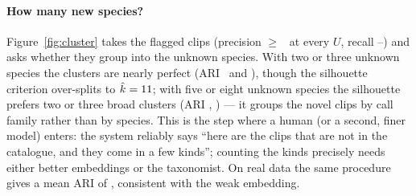 \paragraph{How many new species?} Figure~\ref{fig:cluster} takes the flagged
clips (precision $\geq$ \CluPrecMin\ at every $U$, recall \CluRecallUTwo--\CluRecallUFive)
and asks whether they group into the unknown species. With two or three
unknown species the clusters are nearly perfect (ARI \CluAriUTwo\ and
\CluAriUThree), though the silhouette criterion over-splits to
$\hat k = 11$; with five or eight unknown species the silhouette
prefers two or three broad clusters (ARI \CluAriUFive, \CluAriUEight) ---
it groups the novel clips by call family rather than by species. This is the
step where a human (or a second, finer model) enters: the system reliably
says ``here are the clips that are not in the catalogue, and they come in a
few kinds''; counting the kinds precisely needs either better embeddings or
the taxonomist. On real data the same procedure gives a mean ARI of
\RealAriMean, consistent with the weak embedding.
